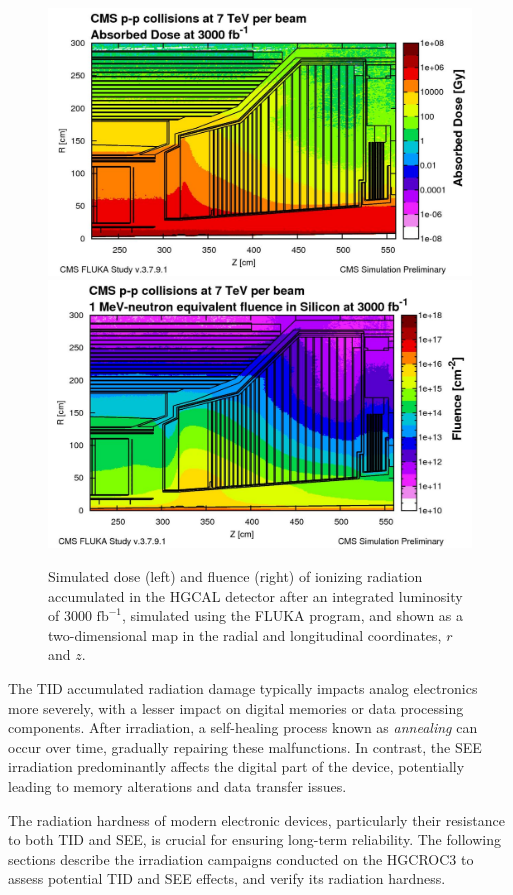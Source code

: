 \begin{figure}
    \centering
    \includegraphics[width=0.49\linewidth]{Figures/HGCAL/HGCALDose.pdf}
    \includegraphics[width=0.49\linewidth]{Figures/HGCAL/HGCALFlux.pdf}
    \caption{Simulated dose (left) and fluence (right) of ionizing radiation accumulated in the HGCAL detector after an integrated luminosity of 3000 $\textrm{fb}^{-1}$, simulated using the FLUKA program, and shown as a two-dimensional map in the radial and longitudinal coordinates, $r$ and $z$.}
    \label{fig:HGCALDose}
\end{figure}

The TID accumulated radiation damage typically impacts analog electronics more severely, with a lesser impact on digital memories or data processing components. After irradiation, a self-healing process known as \textit{annealing} can occur over time, gradually repairing these malfunctions.
In contrast, the SEE irradiation predominantly affects the digital part of the device, potentially leading to memory alterations and data transfer issues.

\bigbreak

The radiation hardness of modern electronic devices, particularly their resistance to both TID and SEE, is crucial for ensuring long-term reliability. The following sections describe the irradiation campaigns conducted on the HGCROC3 to assess potential TID and SEE effects, and verify its radiation hardness.


